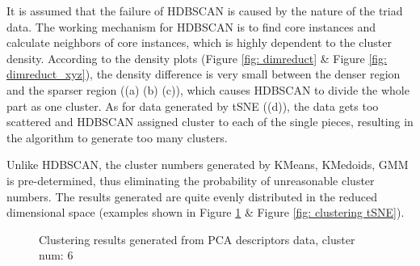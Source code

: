 \documentclass[a4paper]{article}
\begin{document}
It is assumed that the failure of HDBSCAN is caused by the nature of the triad data. The working mechanism for HDBSCAN is to find core instances and calculate neighbors of core instances, which is highly dependent to the cluster density. According to the density plots (Figure \ref{fig: dimreduct} \& Figure \ref{fig: dimreduct_xyz}), the density difference is very small between the denser region and the sparser region ((a) (b) (c)), which causes HDBSCAN to divide the whole part as one cluster. As for data generated by tSNE ((d)), the data gets too scattered and HDBSCAN assigned cluster to each of the single pieces, resulting in the algorithm to generate too many clusters.

Unlike HDBSCAN, the cluster numbers generated by KMeans, KMedoids, GMM is pre-determined, thus eliminating the probability of unreasonable cluster numbers. The results generated are quite evenly distributed in the reduced dimensional space (examples shown in Figure \ref{fig: clustering PCA} \& Figure \ref{fig: clustering tSNE}).

\begin{figure}[H]
    \centering
    \caption{Clustering results generated from PCA descriptors data, cluster num: 6}
    \label{fig: clustering PCA}
\end{figure}
\end{document}
